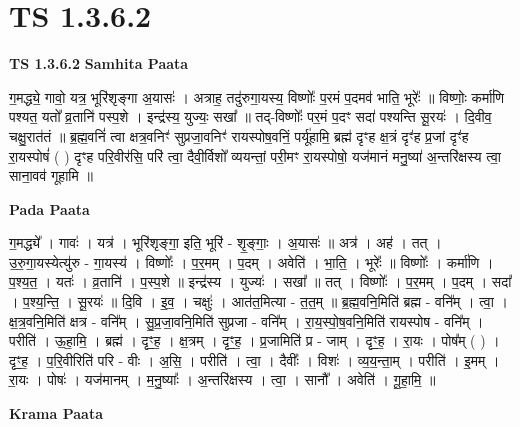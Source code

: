\documentclass[17pt]{extarticle}
\begin{document}
\section{ TS 1.3.6.2 }

\textbf{TS 1.3.6.2 } \newline
\textbf{Samhita Paata} \newline

ग॒मद्ध्ये॒ गावो॒ यत्र॒ भूरि॑शृङ्गा अ॒यासः॑ । अत्राह॒ तदु॑रुगा॒यस्य॒ विष्णोः᳚ प॒रमं प॒दमव॑ भाति॒ भूरेः᳚ ॥ विष्णोः॒ कर्मा॑णि पश्यत॒ यतो᳚ व्र॒तानि॑ पस्प॒शे । इन्द्र॑स्य॒ युज्यः॒ सखा᳚ ॥ तद्-विष्णोः᳚ पर॒मं प॒दꣳ सदा॑ पश्यन्ति सू॒रयः॑ । दि॒वीव॒ चक्षु॒रात॑तं ॥ ब्र॒ह्म॒वनिं॑ त्वा क्षत्र॒वनिꣳ॑ सुप्रजा॒वनिꣳ॑ रायस्पोष॒वनिं॒ पर्यू॑हामि॒ ब्रह्म॑ दृꣳह क्ष॒त्रं दृꣳ॑ह प्र॒जां दृꣳ॑ह रा॒यस्पोषं॑ ( ) दृꣳह परि॒वीर॑सि॒ परि॑ त्वा॒ दैवी॒र्विशो᳚ व्ययन्तां॒ परी॒मꣳ रा॒यस्पोषो॒ यज॑मानं मनु॒ष्या॑ अ॒न्तरि॑क्षस्य त्वा॒ साना॒वव॑ गूहामि ॥ \newline

\textbf{Pada Paata} \newline

ग॒मद्ध्ये᳚ । गावः॑ । यत्र॑ । भूरि॑शृङ्गा॒ इति॒ भूरि॑ - शृ॒ङ्गाः॒ । अ॒यासः॑ ॥ अत्र॑ । अह॑ । तत् । उ॒रु॒गा॒यस्येत्यु॑रु - गा॒यस्य॑ । विष्णोः᳚ । प॒र॒मम् । प॒दम् । अवेति॑ । भा॒ति॒ । भूरेः᳚ ॥ विष्णोः᳚ । कर्मा॑णि । प॒श्य॒त॒ । यतः॑ । व्र॒तानि॑ । प॒स्प॒शे ॥ इन्द्र॑स्य । युज्यः॑ । सखा᳚ ॥ तत् । विष्णोः᳚ । प॒र॒मम् । प॒दम् । सदा᳚ । प॒श्य॒न्ति॒ । सू॒रयः॑ ॥ दि॒वि । इ॒व॒ । चक्षुः॑ । आत॑त॒मित्या - त॒त॒म् ॥ ब्र॒ह्म॒वनि॒मिति॑ ब्रह्म - वनि᳚म् । त्वा॒ । क्ष॒त्र॒वनि॒मिति॑ क्षत्र - वनि᳚म् । सु॒प्र॒जा॒वनि॒मिति॑ सुप्रजा - वनि᳚म् । रा॒य॒स्पो॒ष॒वनि॒मिति॑ रायस्पोष - वनि᳚म् । परीति॑ । ऊ॒हा॒मि॒ । ब्रह्म॑ । दृꣳ॒॒ह॒ । क्ष॒त्रम् । दृꣳ॒॒ह॒ । प्र॒जामिति॑ प्र - जाम् । दृꣳ॒॒ह॒ । रा॒यः । पोष᳚म् ( ) । दृꣳ॒॒ह॒ । प॒रि॒वीरिति॑ परि - वीः । अ॒सि॒ । परीति॑ । त्वा॒ । दैवीः᳚ । विशः॑ । व्य॒य॒न्ता॒म् । परीति॑ । इ॒मम् । रा॒यः । पोषः॑ । यज॑मानम् । म॒नु॒ष्याः᳚ । अ॒न्तरि॑क्षस्य । त्वा॒ । सानौ᳚ । अवेति॑ । गू॒हा॒मि॒ ॥  \newline


\textbf{Krama Paata} \newline
\end{document}
